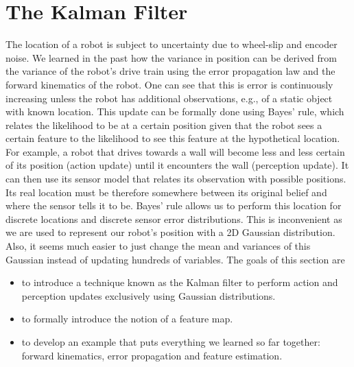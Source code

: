 \section{The Kalman Filter}
The location of a robot is subject to uncertainty due to wheel-slip and encoder noise. We learned in the past how the variance in position can be derived from the variance of the robot's drive train using the error propagation law and the forward kinematics of the robot. One can see that this is error is continuously increasing unless the robot has additional observations, e.g., of a static object with known location. This update can be formally done using Bayes' rule, which relates the likelihood to be at a certain position given that the robot sees a certain feature to the likelihood to see this feature at the hypothetical location. For example, a robot that drives towards a wall will become less and less certain of its position (action update) until it encounters the wall (perception update). It can then use its sensor model that relates its observation with possible positions. Its real location must be therefore somewhere between its original belief and where the sensor tells it to be. Bayes' rule allows us to perform this location for discrete locations and discrete sensor error distributions. This is inconvenient as we are used to represent our robot's position with a 2D Gaussian distribution. Also, it seems much easier to just change the mean and variances of this Gaussian instead of updating hundreds of variables. The goals of this section are
\begin{itemize}
\item to introduce a technique known as the Kalman filter to perform action and perception updates exclusively using Gaussian distributions.
\item to formally introduce the notion of a feature map.
\item to develop an example that puts everything we learned so far together: forward kinematics, error propagation and feature estimation.
\end{itemize}

